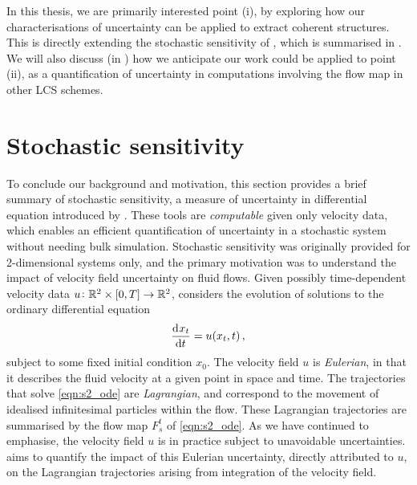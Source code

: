 \begin{romanate}
\end{romanate}
In this thesis, we are primarily interested point (i), by exploring how our characterisations of uncertainty can be applied to extract coherent structures.
This is directly extending the stochastic sensitivity of \citet{Balasuriya_2020_StochasticSensitivityComputable}, which is summarised in .
We will also discuss (in ) how we anticipate our work could be applied to point (ii), as a quantification of uncertainty in computations involving the flow map in other LCS schemes.




\section{Stochastic sensitivity}\label{sec:s2_summ}
To conclude our background and motivation, this section provides a brief summary of stochastic sensitivity, a measure of uncertainty in differential equation introduced by \citet{Balasuriya_2020_StochasticSensitivityComputable}.
These tools are \emph{computable} given only velocity data, which enables an efficient quantification of uncertainty in a stochastic system without needing bulk simulation.
Stochastic sensitivity was originally provided for 2-dimensional systems only, and the primary motivation was to understand the impact of velocity field uncertainty on fluid flows.
Given possibly time-dependent velocity data \(u\colon \mathbb{R}^2 \times [0,T] \to \mathbb{R}^2\), \citet{Balasuriya_2020_StochasticSensitivityComputable} considers the evolution of solutions to the ordinary differential equation
\begin{equation}\label{eqn:s2_ode}
	\dod{x_t}{t} = u\!\left(x_t, t\right),
\end{equation}
subject to some fixed initial condition \(x_0\).
The velocity field \(u\) is \emph{Eulerian}, in that it describes the fluid velocity at a given point in space and time.
The trajectories that solve \cref{eqn:s2_ode} are \emph{Lagrangian}, and correspond to the movement of idealised infinitesimal particles within the flow.
These Lagrangian trajectories are summarised by the flow map \(F_s^t\) of \cref{eqn:s2_ode}.
As we have continued to emphasise, the velocity field \(u\) is in practice subject to unavoidable uncertainties.
\citet{Balasuriya_2020_StochasticSensitivityComputable} aims to quantify the impact of this Eulerian uncertainty, directly attributed to \(u\), on the Lagrangian trajectories arising from integration of the velocity field.

